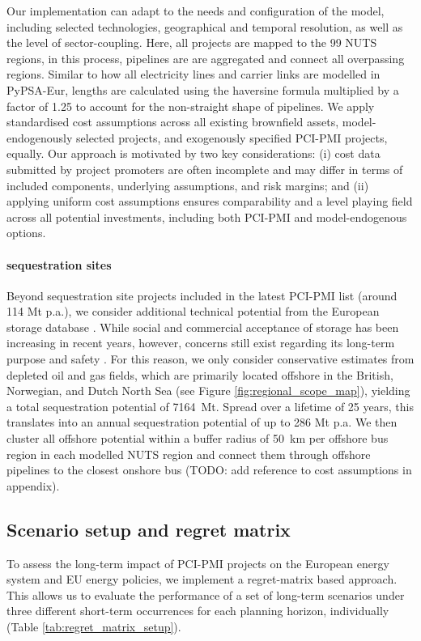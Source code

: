 \documentclass[preprint,12pt,sort&compress]{elsarticle}
\begin{document}
Our implementation can adapt to the needs and configuration of the model, including selected technologies, geographical and temporal resolution, as well as the level of sector-coupling. Here, all projects are mapped to the 99 NUTS regions, in this process, pipelines are are aggregated and connect all overpassing regions. Similar to how all electricity lines and carrier links are modelled in PyPSA-Eur, lengths are calculated using the haversine formula multiplied by a factor of 1.25 to account for the non-straight shape of pipelines.
We apply standardised cost assumptions \cite{zeyenPyPSATechnologydataV01012025} across all existing brownfield assets, model-endogenously selected projects, and exogenously specified PCI-PMI projects, equally. Our approach is motivated by two key considerations: (i) cost data submitted by project promoters are often incomplete and may differ in terms of included components, underlying assumptions, and risk margins; and (ii) applying uniform cost assumptions ensures comparability and a level playing field across all potential investments, including both PCI-PMI and model-endogenous options. 

\paragraph{ sequestration sites}
\label{sec:co2_sequestration_sites}
Beyond  sequestration site projects included in the latest PCI-PMI list (around 114 Mt p.a.), we consider additional technical potential from the European  storage database \cite{europeancommissionEuropeanCO2Storage2020,hofmannH2CO2Network2025}. While social and commercial acceptance of  storage has been increasing in recent years, however, concerns still exist regarding its long-term purpose and safety \cite{vanalphenSocietalAcceptanceCarbon2007}. For this reason, we only consider conservative estimates from depleted oil and gas fields, which are primarily located offshore in the British, Norwegian, and Dutch North Sea (see Figure \ref{fig:regional_scope_map}), yielding a total sequestration potential of \SI{7164}{Mt}. Spread over a lifetime of 25 years, this translates into an annual sequestration potential of up to 286 Mt p.a. We then cluster all offshore potential within a buffer radius of \SI{50}{km} per offshore bus region in each modelled NUTS region and connect them through offshore  pipelines to the closest onshore bus (TODO: add reference to cost assumptions in appendix). 


\subsection{Scenario setup and regret matrix}
\label{sec:scenario_setup}
To assess the long-term impact of PCI-PMI projects on the European energy system and EU energy policies, we implement a regret-matrix based approach. This allows us to evaluate the performance of a set of long-term scenarios under three different short-term occurrences for each planning horizon, individually (Table \ref{tab:regret_matrix_setup}).
\end{document}
